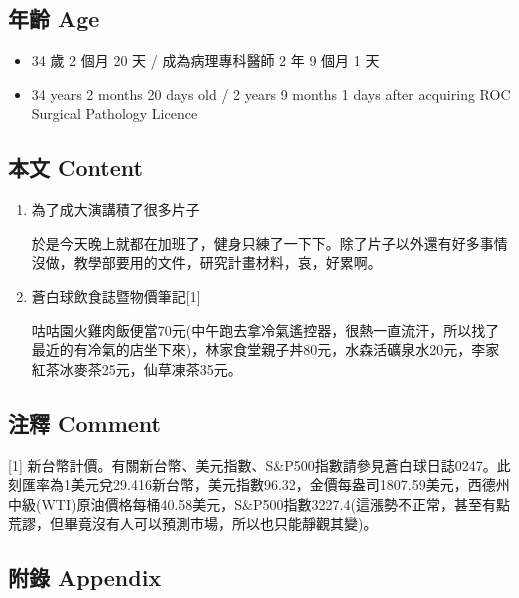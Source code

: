 \documentclass[a5paper, 11pt
]{book}
\providecommand{\tightlist}{%
  \setlength{\itemsep}{0pt}\setlength{\parskip}{0pt}}
\begin{document}
\hypertarget{ux5e74ux9f61-age-42}{%
\subsection{年齡 Age}\label{ux5e74ux9f61-age-42}}

\begin{itemize}
\tightlist
\item
  34 歲 2 個月 20 天 / 成為病理專科醫師 2 年 9 個月 1 天
\item
  34 years 2 months 20 days old / 2 years 9 months 1 days after
  acquiring ROC Surgical Pathology Licence
\end{itemize}

\hypertarget{ux672cux6587-content-42}{%
\subsection{本文 Content}\label{ux672cux6587-content-42}}

\begin{enumerate}
\def\labelenumi{\arabic{enumi}.}
\item
  為了成大演講積了很多片子

  於是今天晚上就都在加班了，健身只練了一下下。除了片子以外還有好多事情沒做，教學部要用的文件，研究計畫材料，哀，好累啊。
\item
  蒼白球飲食誌暨物價筆記{[}1{]}

  咕咕園火雞肉飯便當70元(中午跑去拿冷氣遙控器，很熱一直流汗，所以找了最近的有冷氣的店坐下來)，林家食堂親子丼80元，水森活礦泉水20元，李家紅茶冰麥茶25元，仙草凍茶35元。
\end{enumerate}

\hypertarget{ux6ce8ux91cb-comment-42}{%
\subsection{注釋 Comment}\label{ux6ce8ux91cb-comment-42}}

{[}1{]}
新台幣計價。有關新台幣、美元指數、S\&P500指數請參見蒼白球日誌0247。此刻匯率為1美元兌29.416新台幣，美元指數96.32，金價每盎司1807.59美元，西德州中級(WTI)原油價格每桶40.58美元，S\&P500指數3227.4(這漲勢不正常，甚至有點荒謬，但畢竟沒有人可以預測市場，所以也只能靜觀其變)。

\hypertarget{ux9644ux9304-appendix-42}{%
\subsection{附錄 Appendix}\label{ux9644ux9304-appendix-42}}
\end{document}
